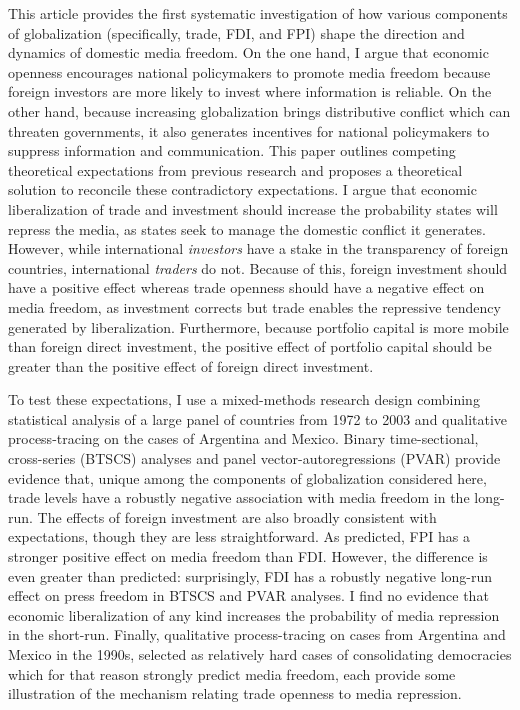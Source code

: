 \documentclass[12pt,a4paper]{article}\usepackage[]{graphicx}\usepackage[]{color}
\begin{document}
This article provides the first systematic investigation of how various components of globalization (specifically, trade, FDI, and FPI) shape the direction and dynamics of domestic media freedom. On the one hand, I argue that economic openness encourages national policymakers to promote media freedom because foreign investors are more likely to invest where information is reliable. On the other hand, because increasing globalization brings distributive conflict which can threaten governments, it also generates incentives for national policymakers to suppress information and communication. This paper outlines competing theoretical expectations from previous research and proposes a theoretical solution to reconcile these contradictory expectations. I argue that economic liberalization of trade and investment should increase the probability states will repress the media, as states seek to manage the domestic conflict it generates. However, while international \emph{investors} have a stake in the transparency of foreign countries, international \emph{traders} do not. Because of this, foreign investment should have a positive effect whereas trade openness should have a negative effect on media freedom, as investment corrects but trade enables the repressive tendency generated by liberalization. Furthermore, because portfolio capital is more mobile than foreign direct investment, the positive effect of portfolio capital should be greater than the positive effect of foreign direct investment.

To test these expectations, I use a mixed-methods research design combining statistical analysis of a large panel of countries from 1972 to 2003 and qualitative process-tracing on the cases of Argentina and Mexico. Binary time-sectional, cross-series (BTSCS) analyses and panel vector-autoregressions (PVAR) provide evidence that, unique among the components of globalization considered here, trade levels have a robustly negative association with media freedom in the long-run. The effects of foreign investment are also broadly consistent with expectations, though they are less straightforward. As predicted, FPI has a stronger positive effect on media freedom than FDI. However, the difference is even greater than predicted: surprisingly, FDI has a robustly negative long-run effect on press freedom in BTSCS and PVAR analyses. I find no evidence that economic liberalization of any kind increases the probability of media repression in the short-run. Finally, qualitative process-tracing on cases from Argentina and Mexico in the 1990s, selected as relatively hard cases of consolidating democracies which for that reason strongly predict media freedom, each provide some illustration of the mechanism relating trade openness to media repression.
\end{document}
